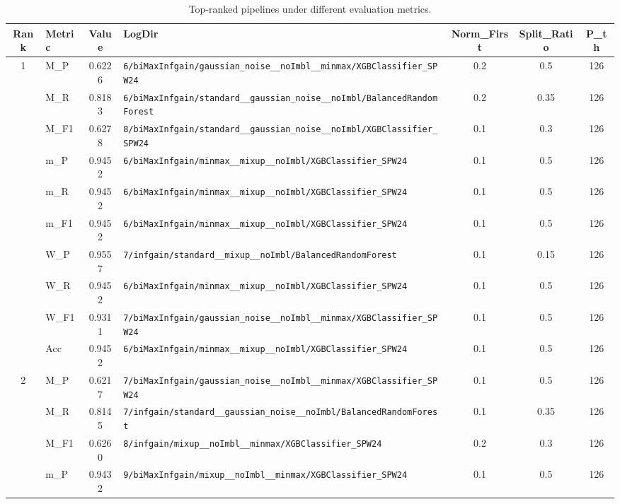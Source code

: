 \begin{table}[htbp]
\caption{Top-ranked pipelines under different evaluation metrics.}
\label{tab:rank_metric_vertical}
\centering
\small
\setlength{\tabcolsep}{4pt}
\begin{tabular}{|c|l|c|>{\ttfamily\footnotesize}p{7.2cm}|c|c|c|}
\hline
Rank & Metric & Value & LogDir & Norm\_First & Split\_Ratio & P\_th \\
\hline
\multirow{10}{*}{1} & M\_P & 0.6226 & \texttt{6/biMaxInfgain/gaussian\_noise\_\_noImbl\_\_minmax/XGBClassifier\_SPW24} & 0.2 & 0.5  & 126 \\ 
 & M\_R & 0.8183 & \texttt{6/biMaxInfgain/standard\_\_gaussian\_noise\_\_noImbl/BalancedRandomForest} & 0.2 & 0.35  & 126 \\ 
 & M\_F1 & 0.6278 & \texttt{8/biMaxInfgain/standard\_\_gaussian\_noise\_\_noImbl/XGBClassifier\_SPW24} & 0.1 & 0.3  & 126 \\ 
 & m\_P & 0.9452 & \texttt{6/biMaxInfgain/minmax\_\_mixup\_\_noImbl/XGBClassifier\_SPW24} & 0.1 & 0.5  & 126 \\ 
 & m\_R & 0.9452 & \texttt{6/biMaxInfgain/minmax\_\_mixup\_\_noImbl/XGBClassifier\_SPW24} & 0.1 & 0.5  & 126 \\ 
 & m\_F1 & 0.9452 & \texttt{6/biMaxInfgain/minmax\_\_mixup\_\_noImbl/XGBClassifier\_SPW24} & 0.1 & 0.5  & 126 \\ 
 & W\_P & 0.9557 & \texttt{7/infgain/standard\_\_mixup\_\_noImbl/BalancedRandomForest} & 0.1 & 0.15  & 126 \\ 
 & W\_R & 0.9452 & \texttt{6/biMaxInfgain/minmax\_\_mixup\_\_noImbl/XGBClassifier\_SPW24} & 0.1 & 0.5  & 126 \\ 
 & W\_F1 & 0.9311 & \texttt{7/biMaxInfgain/gaussian\_noise\_\_noImbl\_\_minmax/XGBClassifier\_SPW24} & 0.1 & 0.5  & 126 \\ 
 & Acc & 0.9452 & \texttt{6/biMaxInfgain/minmax\_\_mixup\_\_noImbl/XGBClassifier\_SPW24} & 0.1 & 0.5  & 126 \\ 
\hline
\multirow{10}{*}{2} & M\_P & 0.6217 & \texttt{7/biMaxInfgain/gaussian\_noise\_\_noImbl\_\_minmax/XGBClassifier\_SPW24} & 0.1 & 0.5  & 126 \\ 
 & M\_R & 0.8145 & \texttt{7/infgain/standard\_\_gaussian\_noise\_\_noImbl/BalancedRandomForest} & 0.1 & 0.35  & 126 \\ 
 & M\_F1 & 0.6260 & \texttt{8/infgain/mixup\_\_noImbl\_\_minmax/XGBClassifier\_SPW24} & 0.2 & 0.3  & 126 \\ 
 & m\_P & 0.9432 & \texttt{9/biMaxInfgain/mixup\_\_noImbl\_\_minmax/XGBClassifier\_SPW24} & 0.1 & 0.5  & 126 \\ 

\end{tabular}
\end{table}
